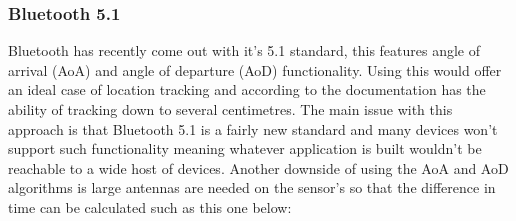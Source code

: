 \subsubsection{Bluetooth 5.1}
Bluetooth has recently come out with it’s 5.1 standard, this features angle of arrival (AoA) and angle of departure (AoD) functionality. Using this would offer an ideal case of location tracking and according to the documentation has the ability of tracking down to several centimetres. The main issue with this approach is that Bluetooth 5.1 is a fairly new standard and many devices won’t support such functionality meaning whatever application is built wouldn’t be reachable to a wide host of devices. Another downside of using the AoA and AoD algorithms is large antennas are needed on the sensor’s so that the difference in time can be calculated such as this one below: